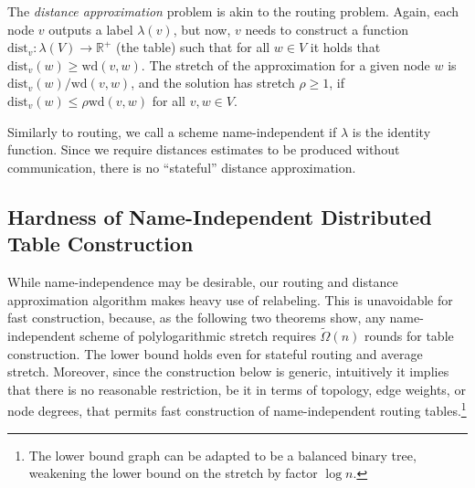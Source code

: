 \documentclass[letterpaper,11pt]{article}
\newcommand{\R}{\mathbb{R}}
\newcommand{\Wd}{\mathrm{wd}}
\begin{document}
The \emph{distance approximation} problem is akin to the routing problem. Again,
each node $v$ outputs a label $\lambda(v)$, but now, $v$ needs to construct a
function $\mathrm{dist}_v: \lambda(V)\to \R^+$ (the table) such that for all
$w\in V$ it holds that $\mathrm{dist}_v(w)\geq \Wd(v,w)$. The stretch of the
approximation for a given node $w$ is $\mathrm{dist}_v(w)/\Wd(v,w)$, and the
solution has stretch $\rho\geq 1$, if $\mathrm{dist}_v(w)\leq \rho \Wd(v,w)$ for
all $v,w\in V$.

Similarly to routing, we call a scheme name-independent if $\lambda$
is the identity function. Since we require distances estimates to be
produced without communication, there is no ``stateful'' distance
approximation.

\subsection{Hardness of Name-Independent Distributed Table Construction}
\label{sec:naming}


While name-independence may be desirable, our routing and distance approximation
algorithm makes heavy use of relabeling. This is unavoidable for fast
construction, because, as the following two theorems show, any name-independent
scheme of polylogarithmic stretch requires $\tilde{\Omega}(n)$ rounds for table
construction. The lower bound holds even for stateful routing 
and average stretch. Moreover, since the construction below is generic,
intuitively it implies that there is no reasonable restriction, be it
in terms of topology, edge weights, or node degrees, that permits fast
construction of name-independent routing tables.\footnote{The lower bound graph can be adapted to be a balanced binary
  tree, weakening the lower bound on the stretch by factor $\log n$.}
\end{document}
